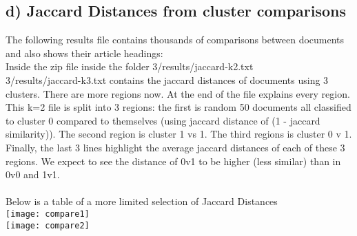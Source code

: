 \subsection*{d) Jaccard Distances from cluster comparisons}
The following results file contains thousands of comparisons between documents and also shows their article headings:
\\
Inside the zip file inside the folder 3/results/jaccard-k2.txt
\\
3/results/jaccard-k3.txt contains the jaccard distances of documents using 3 clusters. There are more regions now. At the end of the file explains every region. 
\\
This k=2 file is split into 3 regions: the first is random 50 documents all classified to cluster 0 compared to themselves (using jaccard distance of (1 - jaccard similarity)). The second region is cluster 1 vs 1. The third regions is cluster 0 v 1. Finally, the last 3 lines highlight the average jaccard distances of each of these 3 regions. We expect to see the distance of 0v1 to be higher (less similar) than in 0v0 and 1v1. 
\\
\\
Below is a table of a more limited selection of Jaccard Distances
\\
\texttt{[image: compare1]}
\\
\texttt{[image: compare2]}

